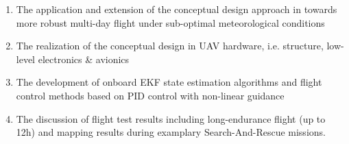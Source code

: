  \begin{enumerate}
\item The application and extension of the conceptual design approach in \cite{Noth_PhD,Leutenegger_JIRS} towards more robust multi-day flight under sub-optimal meteorological conditions
\item The realization of the conceptual design in UAV hardware, i.e. structure, low-level electronics \& avionics 
\item The development of onboard EKF state estimation algorithms and flight control methods based on PID control with non-linear guidance
\item The discussion of flight test results including long-endurance flight (up to 12h) and mapping results during examplary Search-And-Rescue missions.
\end{enumerate}

